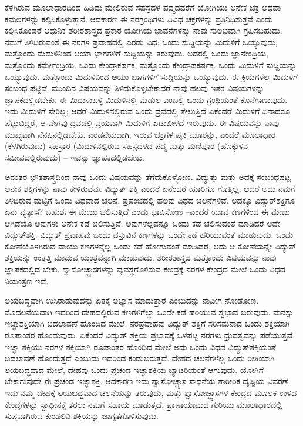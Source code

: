 ಕೆಳಗಿರುವ ಮೂಲಾಧಾರದಿಂದ ಹಿಡಿದು ಮೇಲಿರುವ ಸಹಸ್ರದಳ ಪದ್ಮದವರೆಗೆ ಯೋಗಿಯು ಅನೇಕ ಚಕ್ರ ಅಥವಾ ಕಮಲಗಳನ್ನು ಕಲ್ಪಿಸಿಕೊಳ್ಳುತ್ತಾನೆ. ಆದಕಾರಣ ಈ ನರಗ್ರಂಥಿಗಳು ವಿವಿಧ ಚಕ್ರಗಳನ್ನು ಪ್ರತಿನಿಧಿಸುತ್ತವೆ ಎಂದು ಕಲ್ಪಿಸಿಕೊಂಡರೆ ಆಧುನಿಕ ಶರೀರಶಾಸ್ತ್ರದ ಪ್ರಕಾರ ಯೋಗಿಯ ಭಾವನೆಗಳನ್ನು ನಾವು ಸುಲಭವಾಗಿ ಗ್ರಹಿಸಬಹುದು. ನಮಗೆ ತಿಳಿದಿರುವಂತೆ ಈ ನರಗಳ ಪ್ರವಾಹದಲ್ಲಿ ಎರಡು ವಿಧ: ಒಂದು ಸುದ್ದಿಯನ್ನು ಮಿದುಳಿಗೆ ಒಯ್ಯುವುದು, ಮತ್ತೊಂದು ಮೆದುಳಿನಿಂದ ಆಯಾ ಭಾಗಗಳಿಗೆ ಸುದ್ದಿಯನ್ನು ತರುವುದು. ಅದರಲ್ಲಿ ಒಂದು ಜ್ಞಾನೇಂದ್ರಿಯ, ಮತ್ತೊಂದು ಕರ್ಮೇಂದ್ರಿಯ. ಒಂದು ಕೇಂದ್ರಾಕರ್ಷಕ, ಮತ್ತೊಂದು ಕೇಂದ್ರಾಪಕರ್ಷಕ. ಒಂದು ಮಿದುಳಿಗೆ ಸುದ್ದಿಯನ್ನು ಒಯ್ಯುವುದು. ಮತ್ತೊಂದು ಮಿದುಳಿನಿಂದ ಆಯಾ ಭಾಗಗಳಿಗೆ ಸುದ್ದಿಯನ್ನು ಒಯ್ಯುವುದು. ಈ ಕ್ರಿಯೆಗಳೆಲ್ಲ ಮಿದುಳಿಗೆ ಸಂಬಂಧ ಪಟ್ಟಿವೆ. ಮುಂದಿನ ವಿಷಯವನ್ನು ತಿಳಿದುಕೊಳ್ಳಬೇಕಾದರೆ ನಾವು ಹಲವು ಇತರ ವಿಷಯಗಳನ್ನು ಜ್ಞಾಪಕದಲ್ಲಿಡಬೇಕು. ಈ ಮಿದುಳುಬಳ್ಳಿ ಮಿದುಳಿನಲ್ಲಿ ಮೆಡುಲ  ಎಂಬಲ್ಲಿ ಒಂದು ಗ್ರಂಥಿಯಂತೆ ಕೊನೆಗಾಣುವುದು. ಇದು ಮಿದುಳಿಗೆ ಸೇರಿಲ್ಲ; ಆದರೆ ಮಿದುಳಿನಲ್ಲಿರುವ ಒಂದು ದ್ರವದಲ್ಲಿ ತೇಲುತ್ತಿದೆ ಏಕೆಂದರೆ ಮಿದುಳಿಗೆ ಏನಾದರೂ ಪೆಟ್ಟುಬಿದ್ದರೆ, ಆ ವೇಗವು ದ್ರವದಲ್ಲಿ ವ್ರಯವಾಗಿ ಮಿದುಳಿಗೆ ಏಟುಬೀಳದೆ ಇರುವುದು. ಈ ವಿಷಯವನ್ನು ನಾವು ಮುಖ್ಯವಾಗಿ ನೆನಪಿನಲ್ಲಿಡಬೇಕು. ಎರಡನೆಯದಾಗಿ, ಇರುವ ಚಕ್ರಗಳ ಪೈಕಿ ಮೂರನ್ನು, ಎಂದರೆ ಮೂಲಾಧಾರ (ಕೆಳಗಿರುವುದು) ಸಹಸ್ರಾರ (ಮಿದುಳಿನಲ್ಲಿರುವ ಸಹಸ್ರದಳದ ಪದ್ಮ ಮತ್ತು ಮಣಿಪೂರ (ಹೊಕ್ಕುಳಿನ ಸಮೀಪದಲ್ಲಿರುವುದು) – ಇವನ್ನು ಜ್ಞಾಪಕದಲ್ಲಿಡಬೇಕು. 

\vskip 6pt

ಅನಂತರ ಭೌತಶಾಸ್ತ್ರದಿಂದ ನಾವು ಒಂದು ವಿಷಯವನ್ನು ತೆಗೆದುಕೊಳ್ಳೋಣ. ವಿದ್ಯುತ್ತು ಮತ್ತು ಅದಕ್ಕೆ ಸಂಬಂಧಪಟ್ಟ ಅನೇಕ ಶಕ್ತಿಗಳನ್ನು ನಾವು ಕೇಳಿರುವೆವು. ವಿದ್ಯುತ್​ ಶಕ್ತಿ ಎಂದರೆ ಏನೆಂದರೆ ಯಾರಿಗೂ ಗೊತ್ತಿಲ್ಲ. ಆದರೆ ಅದು ನಮಗೆ ತಿಳಿದಿರುವ ಮಟ್ಟಿಗೆ ಒಂದು ವಿಧವಾದ ಚಲನೆ. ಪ್ರಪಂಚದಲ್ಲಿ ಹಲವು ವಿಧದ ಚಲನೆಗಳಿವೆ. ಅದಕ್ಕೂ ವಿದ್ಯುತ್​ಶಕ್ತಿಗೂ ಏನು ವ್ಯತ್ಯಾಸ? ಬಹುಶಃ ಈ ಮೇಜು ಚಲಿಸುತ್ತಿದೆ ಎಂದು ಭಾವಿಸೋಣ –ಎಂದರೆ ಯಾವ ಕಣಗಳಿಂದ ಈ ಮೇಜು ಆಗಿದೆಯೊ ಅವುಗಳು ಅನೇಕ ಕಡೆ ಚಲಿಸುತ್ತಿವೆ. ಅವುಗಳೆಲ್ಲವನ್ನೂ ಒಂದು ಕಡೆ ಚಲಿಸುವಂತೆ ಮಾಡಿದರೆ ಅದೇ ವಿದ್ಯುತ್​ಶಕ್ತಿ. ವಿದ್ಯುತ್​ ಪ್ರವಾಹವು ಒಂದು ವಸ್ತುವಿನ ಕಣಗಳನ್ನು ಒಂದೇ ಕಡೆ ಹರಿಯುವಂತೆ ಮಾಡುವುದು. ಒಂದು ಕೋಣೆಯೊಳಗಿರುವ ವಾಯು ಕಣಗಳನ್ನೆಲ್ಲ ಒಂದು ಕಡೆ ಹೋಗುವಂತೆ ಮಾಡಿದರೆ, ಅದು ಆ ಕೋಣೆಯನ್ನೇ ವಿದ್ಯುತ್​ ಶಕ್ತಿಯನ್ನು ಉತ್ಪತ್ತಿ ಮಾಡುವ ಯಂತ್ರವನ್ನಾಗಿ ಮಾಡುವುದು. ಶರೀರಶಾಸ್ತ್ರದ ಮತ್ತೊಂದು ವಿಷಯವನ್ನು ನಾವು ಜ್ಞಾಪಕದಲ್ಲಿಡ ಬೇಕು. ಶ್ವಾಸೋಚ್ಛ್ವಾಸಗಳನ್ನು ವ್ಯವಸ್ಥೆಗೊಳಿಸುವ ಕೇಂದ್ರಕ್ಕೆ ನರಗಳ ಕೇಂದ್ರದ ಮೇಲೆ ಒಂದು ವಿಧದ ನಿಯಂತ್ರಣ ಇದೆ. 

\vskip 6pt

ಲಯಬದ್ಧವಾಗಿ ಉಸಿರಾಡುವುದನ್ನು ಏತಕ್ಕೆ ಅಭ್ಯಾಸ ಮಾಡುತ್ತಾರೆ ಎಂಬುದನ್ನು ನಾವೀಗ ನೋಡೋಣ. ಮೊದಲನೆಯದಾಗಿ ಇದರಿಂದ ದೇಹದಲ್ಲಿರುವ ಕಣಗಳಿಗೆಲ್ಲಾ ಒಂದೇ ಕಡೆ ಹರಿಯುವ ಸ್ವಭಾವ ಬರುವುದು. ಮನಸ್ಸು ಇಚ್ಛಾಶಕ್ತಿಯಾಗಿ ಬದಲಾವಣೆ ಹೊಂದಿದ ಮೇಲೆ, ನರಪ್ರವಾಹವು ವಿದ್ಯುತ್​ ಶಕ್ತಿಗೆ ಸರಿಸಮನಾದ ಒಂದು ಶಕ್ತಿಯಾಗಿ ರೂಪಾಂತರ ಹೊಂದುವುದು. ಏಕೆಂದರೆ ವಿದ್ಯುತ್​ ಶಕ್ತಿಯ ಪ್ರಭಾವಕ್ಕೆ ಒಳಪಟ್ಟ ನರಗಳು ಧ್ರುವತ್ವವನ್ನು  ಪಡೆಯುತ್ತವೆ. ಇಚ್ಛಾ ಶಕ್ತಿಯು ನರಗಳ ಶಕ್ತಿಯಾಗಿ ರೂಪಾಂತರ ಹೊಂದಿದ ಮೇಲೆ ಅದು ಒಂದು ವಿಧದ ವಿದ್ಯುತ್​ ಶಕ್ತಿಯಂತೆ ಬದಲಾವಣೆ ಹೊಂದುತ್ತದೆ ಎಂಬುದು ಇದರಿಂದ ಕಂಡುಬರುತ್ತದೆ. ದೇಹದ ಚಲನೆಗಳೆಲ್ಲ ಒಂದು ರೀತಿಯಾಗಿ ಲಯಬದ್ಧವಾದ ಮೇಲೆ, ದೇಹವು ಒಂದು ಪ್ರಚಂಡ ಇಚ್ಛಾಶಕ್ತಿಯ ಬ್ಯಾಟರಿಯಂತೆ ಆಗುವುದು. ಯೋಗಿಗೆ ಬೇಕಾಗುವುದೇ ಈ ಪ್ರಚಂಡ ಇಚ್ಛಾಶಕ್ತಿ. ಆದಕಾರಣ ಇದು ಶ್ವಾಸೋಚ್ಛ್ವಾಸ ಸಾಧನೆಯ ಶಾರೀರಿಕ ದೃಷ್ಟಿಯ ವಿವರಣೆ. ಇದು ನಮ್ಮ ದೇಹಕ್ಕೆ ಲಯಬದ್ಧವಾದ ಚಲನೆಯನ್ನು ತರುವುದು, ಮತ್ತು ಶ್ವಾಸೋಚ್ಛ್ವಾಸಗಳ ಕೇಂದ್ರದ ಮೂಲಕ ಉಳಿದ ಕೇಂದ್ರಗಳನ್ನು ಸ್ವಾಧೀನಕ್ಕೆ ತರಲು ನಮಗೆ ಸಹಾಯ ಮಾಡುತ್ತದೆ. ಪ್ರಾಣಾಯಾಮದ ಗುರಿಯು ಮೂಲಾಧಾರದಲ್ಲಿ ಸುಪ್ತವಾಗಿರುವ ಕುಂಡಲಿನಿ ಶಕ್ತಿಯನ್ನು ಜಾಗೃತಗೊಳಿಸುವುದು. 

